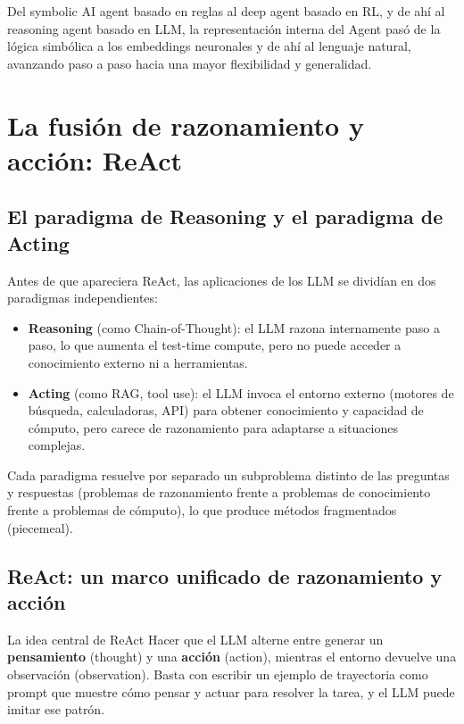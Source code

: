 \documentclass[a4paper]{article}
\begin{document}
Del symbolic AI agent basado en reglas al deep agent basado en RL, y de ahí al reasoning agent basado en LLM, la representación interna del Agent pasó de la lógica simbólica a los embeddings neuronales y de ahí al lenguaje natural, avanzando paso a paso hacia una mayor flexibilidad y generalidad.
\section{La fusión de razonamiento y acción: ReAct}

\subsection{El paradigma de Reasoning y el paradigma de Acting}

Antes de que apareciera ReAct, las aplicaciones de los LLM se dividían en dos paradigmas independientes:

\begin{itemize}
    \item \textbf{Reasoning} (como Chain-of-Thought): el LLM razona internamente paso a paso, lo que aumenta el test-time compute, pero no puede acceder a conocimiento externo ni a herramientas.
    \item \textbf{Acting} (como RAG, tool use): el LLM invoca el entorno externo (motores de búsqueda, calculadoras, API) para obtener conocimiento y capacidad de cómputo, pero carece de razonamiento para adaptarse a situaciones complejas.
\end{itemize}

Cada paradigma resuelve por separado un subproblema distinto de las preguntas y respuestas (problemas de razonamiento frente a problemas de conocimiento frente a problemas de cómputo), lo que produce métodos fragmentados (piecemeal).

\subsection{ReAct: un marco unificado de razonamiento y acción}

\begin{importantbox}{La idea central de ReAct}
Hacer que el LLM alterne entre generar un \textbf{pensamiento} (thought) y una \textbf{acción} (action), mientras el entorno devuelve una observación (observation). Basta con escribir un ejemplo de trayectoria como prompt que muestre cómo pensar y actuar para resolver la tarea, y el LLM puede imitar ese patrón.
\end{importantbox}
\end{document}
